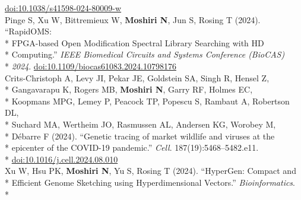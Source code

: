 \documentclass[margin,line]{res}
\begin{document}
\begin{resume}
\hspace*{8mm} \href{https://doi.org/10.1038/s41598-024-80009-w}{doi:10.1038/s41598-024-80009-w}\\
\hspace*{4mm} Pinge S, Xu W, Bittremieux W, \textbf{Moshiri N}, Jun S, Rosing T (2024). ``RapidOMS:\\*
\hspace*{9.5mm} FPGA-based Open Modification Spectral Library Searching with HD\\*
\hspace*{9.5mm} Computing.'' \textit{IEEE Biomedical Circuits and Systems Conference (BioCAS)}\\*\vspace{2mm}
\hspace*{8mm} \textit{2024}. \href{http://doi.org/10.1109/biocas61083.2024.10798176}{doi:10.1109/biocas61083.2024.10798176}\\
\hspace*{4mm} Crits-Christoph A, Levy JI, Pekar JE, Goldstein SA, Singh R, Hensel Z,\\*
\hspace*{9.5mm} Gangavarapu K, Rogers MB, \textbf{Moshiri N}, Garry RF, Holmes EC,\\*
\hspace*{9.5mm} Koopmans MPG, Lemey P, Peacock TP, Popescu S, Rambaut A, Robertson DL,\\*
\hspace*{9.5mm} Suchard MA, Wertheim JO, Rasmussen AL, Andersen KG, Worobey M,\\*
\hspace*{9.5mm} D\'{e}barre F (2024). ``Genetic tracing of market wildlife and viruses at the\\*
\hspace*{9.5mm} epicenter of the COVID-19 pandemic.'' \textit{Cell}. 187(19):5468--5482.e11.\\*\vspace{2mm}
\hspace*{8mm} \href{https://doi.org/10.1016/j.cell.2024.08.010}{doi:10.1016/j.cell.2024.08.010}\\
\hspace*{4mm} Xu W, Hsu PK, \textbf{Moshiri N}, Yu S, Rosing T (2024). ``HyperGen: Compact and\\*
\hspace*{9.5mm} Efficient Genome Sketching using Hyperdimensional Vectors.'' \textit{Bioinformatics}.\\*\vspace{2mm}

\end{resume}
\end{document}
